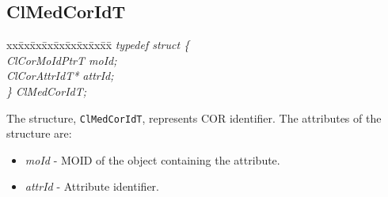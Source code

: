 \begin{flushleft}
\subsection{ClMedCorIdT}
\begin{tabbing}
xx\=xx\=xx\=xx\=xx\=xx\=xx\=xx\=xx\=\kill
\textit{typedef struct \{}\\
\>\>\>\>\textit{ClCorMoIdPtrT        moId;}\\
\>\>\>\>\textit{ClCorAttrIdT*         attrId;}\\
\textit{\} ClMedCorIdT;}\end{tabbing}
The structure, {\tt{ClMedCorIdT}}, represents COR identifier. The attributes of the structure are:
\begin{itemize}
\item
\textit{moId} - MOID of the object containing the attribute.
\item
\textit{attrId} - Attribute identifier.
\end{itemize}


\end{flushleft}
